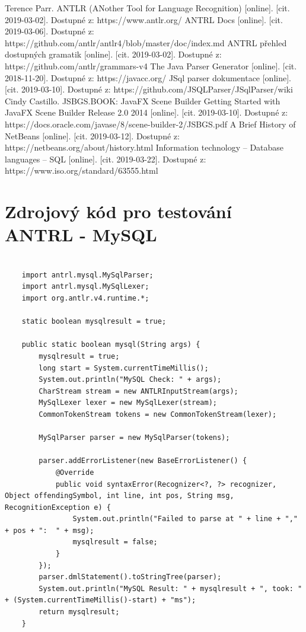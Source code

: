 \documentclass[czech,bachelor,public,dept460,male,cpdeclaration,twoside]{diploma}
\begin{document}
\begin{thebibliography}{99}
	 Terence Parr. ANTLR (ANother Tool for Language Recognition) [online]. [cit. 2019-03-02]. Dostupné z: https://www.antlr.org/
	 ANTRL Docs [online]. [cit. 2019-03-06]. Dostupné z: https://github.com/antlr/antlr4/blob/master/doc/index.md
	 ANTRL přehled dostupných gramatik [online]. [cit. 2019-03-02]. Dostupné z: https://github.com/antlr/grammars-v4
	 The Java Parser Generator [online]. [cit. 2018-11-20]. Dostupné z: https://javacc.org/
	 JSql parser dokumentace [online]. [cit. 2019-03-10]. Dostupné z: https://github.com/JSQLParser/JSqlParser/wiki
	 Cindy Castillo. JSBGS.BOOK: JavaFX Scene Builder Getting Started with JavaFX Scene Builder Release 2.0 2014 [online]. [cit. 2019-03-10]. Dostupné z: https://docs.oracle.com/javase/8/scene-builder-2/JSBGS.pdf
	 A Brief History of NetBeans [online]. [cit. 2019-03-12]. Dostupné z: https://netbeans.org/about/history.html
	 Information technology -- Database languages -- SQL [online]. [cit. 2019-03-22]. Dostupné z: https://www.iso.org/standard/63555.html
	
	
	
	
	
\end{thebibliography}


\appendix %
\section{Zdrojový kód pro testování ANTRL - MySQL}
\begin{lstlisting}[caption=ANTRL MySQL]

	import antrl.mysql.MySqlParser;
	import antrl.mysql.MySqlLexer;
	import org.antlr.v4.runtime.*;

    static boolean mysqlresult = true;

    public static boolean mysql(String args) {
        mysqlresult = true;
        long start = System.currentTimeMillis();
        System.out.println("MySQL Check: " + args);
        CharStream stream = new ANTLRInputStream(args);
        MySqlLexer lexer = new MySqlLexer(stream);
        CommonTokenStream tokens = new CommonTokenStream(lexer);

        MySqlParser parser = new MySqlParser(tokens);

        parser.addErrorListener(new BaseErrorListener() {
            @Override
            public void syntaxError(Recognizer<?, ?> recognizer, Object offendingSymbol, int line, int pos, String msg, RecognitionException e) {
                System.out.println("Failed to parse at " + line + "," + pos + ":  " + msg);
                mysqlresult = false;
            }
        });
        parser.dmlStatement().toStringTree(parser);
        System.out.println("MySQL Result: " + mysqlresult + ", took: " + (System.currentTimeMillis()-start) + "ms");
        return mysqlresult;
    }
\end{lstlisting}
\end{document}
